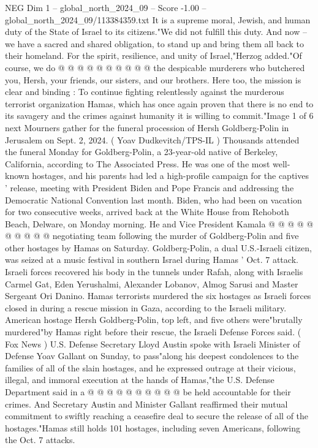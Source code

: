 \begin{textsample}{NEG Dim 1 – global\_north\_2024\_09 – Score -1.00 – global\_north\_2024\_09/113384359.txt}
It is a supreme moral, Jewish, and human duty of the State of Israel to its citizens."We did not fulfill this duty.
And now -- we have a sacred and shared obligation, to stand up and bring them all back to their homeland.
For the spirit, resilience, and unity of Israel,"Herzog added."Of course, we do @ @ @ @ @ @ @ @ @ @ the despicable murderers who butchered you, Hersh, your friends, our sisters, and our brothers.
Here too, the mission is clear and binding : To continue fighting relentlessly against the murderous terrorist organization Hamas, which has once again proven that there is no end to its savagery and the crimes against humanity it is willing to commit."Image 1 of 6 next Mourners gather for the funeral procession of Hersh Goldberg-Polin in Jerusalem on Sept. 2, 2024. ( Yoav Dudkevitch/TPS-IL ) Thousands attended the funeral Monday for Goldberg-Polin, a 23-year-old native of Berkeley, California, according to The Associated Press.
He was one of the most well-known hostages, and his parents had led a high-profile campaign for the captives ' release, meeting with President Biden and Pope Francis and addressing the Democratic National Convention last month.
Biden, who had been on vacation for two consecutive weeks, arrived back at the White House from Rehoboth Beach, Delware, on Monday morning.
He and Vice President Kamala @ @ @ @ @ @ @ @ @ @ negotiating team following the murder of Goldberg-Polin and five other hostages by Hamas on Saturday.
Goldberg-Polin, a dual U.S.-Israeli citizen, was seized at a music festival in southern Israel during Hamas ' Oct. 7 attack.
Israeli forces recovered his body in the tunnels under Rafah, along with Israelis Carmel Gat, Eden Yerushalmi, Alexander Lobanov, Almog Sarusi and Master Sergeant Ori Danino.
Hamas terrorists murdered the six hostages as Israeli forces closed in during a rescue mission in Gaza, according to the Israeli military.
American hostage Hersh Goldberg-Polin, top left, and five others were"brutally murdered"by Hamas right before their rescue, the Israeli Defense Forces said. ( Fox News ) U.S.
Defense Secretary Lloyd Austin spoke with Israeli Minister of Defense Yoav Gallant on Sunday, to pass"along his deepest condolences to the families of all of the slain hostages, and he expressed outrage at their vicious, illegal, and immoral execution at the hands of Hamas,"the U.S.
Defense Department said in a @ @ @ @ @ @ @ @ @ @ be held accountable for their crimes.
And Secretary Austin and Minister Gallant reaffirmed their mutual commitment to swiftly reaching a ceasefire deal to secure the release of all of the hostages."Hamas still holds 101 hostages, including seven Americans, following the Oct. 7 attacks.

\end{textsample}
